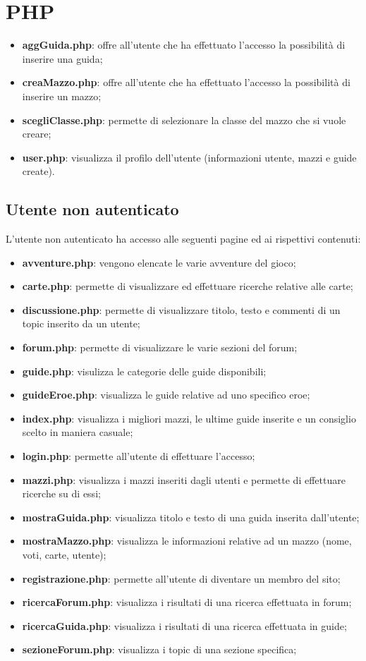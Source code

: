\section{PHP}
\begin{itemize}
	\item  \textbf{aggGuida.php}: offre all'utente che ha effettuato l'accesso la possibilità di inserire una guida;
	\item \textbf{creaMazzo.php}: offre all'utente che ha effettuato l'accesso la possibilità di inserire un mazzo;
	\item \textbf{scegliClasse.php}: permette di selezionare la classe del mazzo che si vuole creare;
	\item \textbf{user.php}: visualizza il profilo dell'utente (informazioni utente, mazzi e guide create).
	
\end{itemize}

\subsection{Utente non autenticato}
L'utente non autenticato ha accesso alle seguenti pagine ed ai rispettivi contenuti:
\begin{itemize}
	\item \textbf{avventure.php}: vengono elencate le varie avventure del gioco;
	\item \textbf{carte.php}: permette di visualizzare ed effettuare ricerche relative alle carte;
	\item \textbf{discussione.php}: permette di visualizzare titolo, testo e commenti di un topic inserito da un utente;
	\item \textbf{forum.php}: permette di visualizzare le varie sezioni del forum;
	\item \textbf{guide.php}: visulizza le categorie delle guide disponibili;
	\item \textbf{guideEroe.php}: visualizza le guide relative ad uno specifico eroe;
	\item \textbf{index.php}: visualizza i migliori mazzi, le ultime guide inserite e un consiglio scelto in maniera casuale;
	\item \textbf{login.php}: permette all'utente di effettuare l'accesso;
	\item \textbf{mazzi.php}: visualizza i mazzi inseriti dagli utenti e permette di effettuare ricerche su di essi;
	\item \textbf{mostraGuida.php}: visualizza titolo e testo di una guida inserita dall'utente;
	\item \textbf{mostraMazzo.php}: visualizza le informazioni relative ad un mazzo (nome, voti, carte, utente);
	\item \textbf{registrazione.php}: permette all'utente di diventare un membro del sito;
	\item \textbf{ricercaForum.php}: visualizza i risultati di una ricerca effettuata in forum;
	\item \textbf{ricercaGuida.php}: visualizza i risultati di una ricerca effettuata in guide;
	\item \textbf{sezioneForum.php}: visualizza i topic di una sezione specifica;
\end{itemize}
